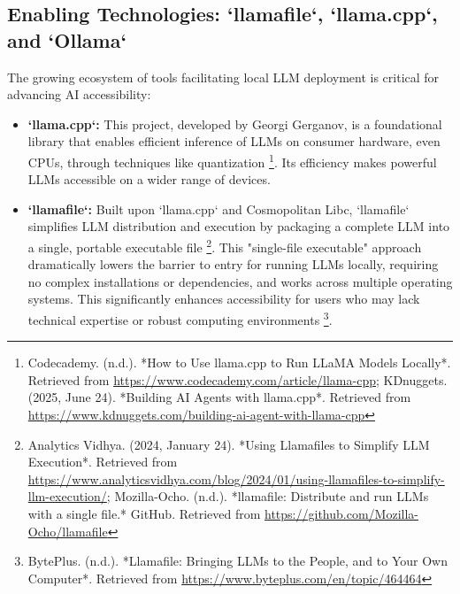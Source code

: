 \subsection{Enabling Technologies: `llamafile`, `llama.cpp`, and `Ollama`}
The growing ecosystem of tools facilitating local LLM deployment is critical for advancing AI accessibility:
\begin{itemize}

    \item \textbf{`llama.cpp`:} This project, developed by Georgi Gerganov, is a foundational library that enables efficient inference of LLMs on consumer hardware, even CPUs, through techniques like quantization \footnote{Codecademy. (n.d.). *How to Use llama.cpp to Run LLaMA Models Locally*. Retrieved from \url{https://www.codecademy.com/article/llama-cpp}; KDnuggets. (2025, June 24). *Building AI Agents with llama.cpp*. Retrieved from \url{https://www.kdnuggets.com/building-ai-agent-with-llama-cpp}}. Its efficiency makes powerful LLMs accessible on a wider range of devices.

    \item \textbf{`llamafile`:} Built upon `llama.cpp` and Cosmopolitan Libc, `llamafile` simplifies LLM distribution and execution by packaging a complete LLM into a single, portable executable file \footnote{Analytics Vidhya. (2024, January 24). *Using Llamafiles to Simplify LLM Execution*. Retrieved from \url{https://www.analyticsvidhya.com/blog/2024/01/using-llamafiles-to-simplify-llm-execution/}; Mozilla-Ocho. (n.d.). *llamafile: Distribute and run LLMs with a single file.* GitHub. Retrieved from \url{https://github.com/Mozilla-Ocho/llamafile}}. This "single-file executable" approach dramatically lowers the barrier to entry for running LLMs locally, requiring no complex installations or dependencies, and works across multiple operating systems. This significantly enhances accessibility for users who may lack technical expertise or robust computing environments \footnote{BytePlus. (n.d.). *Llamafile: Bringing LLMs to the People, and to Your Own Computer*. Retrieved from \url{https://www.byteplus.com/en/topic/464464}}.


\end{itemize}
